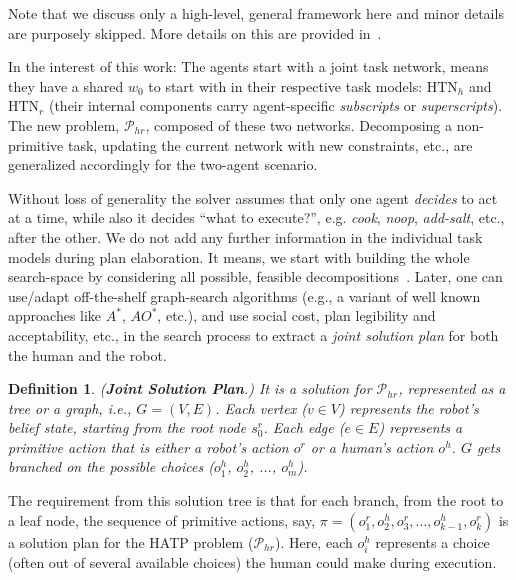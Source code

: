 \documentclass[letterpaper]{article} %
\newtheorem{definition}{Definition}
\begin{document}
Note that we discuss only a high-level, general framework here and minor details are purposely skipped. 
More details on this are provided in~\cite{thesisBuisan21,buisan:hal-03684211}. 

In the interest of this work: The agents start with a joint task network, means they have a shared $w_0$ to start with in their respective task models: $\mathrm{HTN}_{h}$ and $\mathrm{HTN}_{r}$ (their internal components carry agent-specific \textit{subscripts} or \textit{superscripts}). The new problem, $\mathcal{P}_{hr}$, composed of these two networks. Decomposing a non-primitive task, updating the current network with new constraints, etc., are generalized accordingly for the two-agent scenario. 

Without loss of generality the solver assumes that only one agent \textit{decides} to act at a time, while also it decides ``what to execute?'', e.g. \textit{cook}, \textit{noop}, \textit{add-salt}, etc., after the other.
We do not add any further information in the individual task models during plan elaboration. It means, we start with building the whole search-space by considering all possible, feasible decompositions~\cite{buisan:hal-03684211}. Later, one can use/adapt off-the-shelf graph-search algorithms (e.g., a variant of well known approaches like $A^*$, $AO^*$, etc.), and use social cost, plan legibility and acceptability, etc., in the search process to extract a \textit{joint solution plan} for both the human and the robot. 

\begin{definition}
(\textbf{Joint Solution Plan}.) 
{It is a solution for $\mathcal{P}_{hr}$, represented as a tree or a graph, i.e., $G=(V,E)$. Each vertex ($v \in V$) represents the robot's belief state, starting from the root node $s_0^r$. Each edge ($e \in E$) represents a primitive action that is either a robot's action $o^{r}$ or a human's action $o^{h}$. $G$ gets branched on the possible choices ($o^{h}_1$, $o^{h}_2$, ..., $o^{h}_m$). 
}  
\end{definition}

The requirement from this solution tree is that for each branch, from the root to a leaf node, the sequence of primitive actions, say,  $\pi=(o_1^r,o_2^h,o_3^r,...,o_{k-1}^h,o_k^r)$ is a solution plan for the HATP problem ($\mathcal{P}_{hr}$). Here, each $o_i^h$ represents a choice (often out of several available choices) the human could make during execution.
\end{document}
